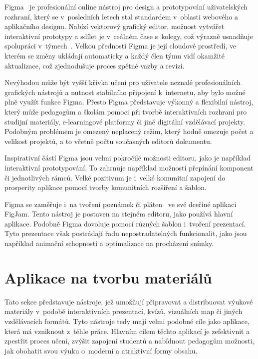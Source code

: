 Figma~\cite{figma_website} je profesionální online nástroj pro design a prototypování uživatelských rozhraní, který se v~posledních letech stal standardem v~oblasti webového a aplikačního designu. 
Nabízí vektorový grafický editor, možnost vytvářet interaktivní prototypy a sdílet je v~reálném čase s~kolegy, což výrazně usnadňuje spolupráci v~týmech~\cite{figma_website}. 
Velkou předností Figma je její cloudové prostředí, ve kterém se změny ukládají automaticky a každý člen týmu vidí okamžité aktualizace, což zjednodušuje proces zpětné vazby a revizí. 

Nevýhodou může být vyšší křivka učení pro uživatele neznalé profesionálních grafických nástrojů a nutnost stabilního připojení k~internetu, aby bylo možné plně využít funkce Figma. 
Přesto Figma představuje výkonný a flexibilní nástroj, který může pedagogům a školám pomoci při tvorbě interaktivních rozhraní pro studijní materiály, e-learningové platformy či jiné digitální vzdělávací projekty.
Podobným problémem je omezený neplacený režim, který hodně omezuje počet a velikost projektů, a to včetně počtu současných editorů dokumentu.

Inspirativní částí Figma jsou velmi pokročilé možnosti editoru, jako je například interaktivní prototypování.
To zahrnuje například možnosti přepínání komponent či jednotlivých rámců.
Velké pozitivum je i~velké komunitní zapojení do prosperity aplikace pomocí tvorby komunitních rozšíření a šablon.

Figma se zaměřuje i~na tvoření poznámek či pláten~\cite{figma_figjam} ve své dceřiné aplikaci FigJam.
Tento nástroj je postaven na stejném editoru, jako používá hlavní aplikace.
Podobně Figma dovoluje pomocí různých šablon i~tvoření prezentací.
Tyto prezentace však postrádají řadu nepostradatelných funkcionalit, jako jsou například animační schopnosti a optimalizace na procházení snímky.

\section{Aplikace na tvorbu materiálů}\label{text:analyza/materialy}

Tato sekce představuje nástroje, jež umožňují připravovat a distribuovat výukové materiály v~podobě interaktivních prezentací, kvízů, vizuálních map či jiných vzdělávacích formátů.
Tyto nástroje tedy mají velmi podobné cíle jako aplikace, která má vzniknout z~téhle práce.
Hlavním cílem těchto aplikací je zefektivnit a zpestřit proces učení, zvýšit zapojení studentů a nabídnout pedagogům možnosti, jak obohatit svou výuku o~moderní a atraktivní formy obsahu.

